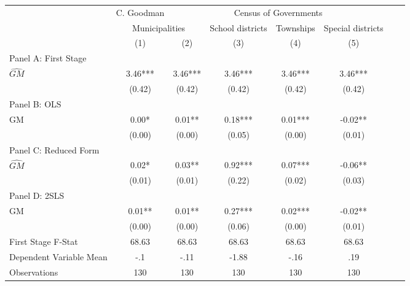    \begin{tabular}{l*{7}{c}} \toprule
&\multicolumn{1}{c}{C. Goodman}&\multicolumn{4}{c}{Census of Governments}\\\cmidrule(lr){2-2}\cmidrule(lr){3-6}
&\multicolumn{2}{c}{Municipalities}&\multicolumn{1}{c}{School districts}&\multicolumn{1}{c}{Townships}&\multicolumn{1}{c}{Special districts}\\\cmidrule(lr){2-3}\cmidrule(lr){4-6}
&\multicolumn{1}{c}{(1)}&\multicolumn{1}{c}{(2)}&\multicolumn{1}{c}{(3)}&\multicolumn{1}{c}{(4)}&\multicolumn{1}{c}{(5)}\\
\cmidrule(lr){1-6}
\multicolumn{5}{l}{Panel A: First Stage}\\
\cmidrule(lr){1-6}
$\widehat{GM}$  &     3.46***&     3.46***&     3.46***&     3.46***&     3.46***\\
                &   (0.42)   &   (0.42)   &   (0.42)   &   (0.42)   &   (0.42)   \\
\cmidrule(lr){1-6}
\multicolumn{5}{l}{Panel B: OLS}\\
\cmidrule(lr){1-6}
GM              &     0.00*  &     0.01** &     0.18***&     0.01***&    -0.02** \\
                &   (0.00)   &   (0.00)   &   (0.05)   &   (0.00)   &   (0.01)   \\
\cmidrule(lr){1-6}
\multicolumn{5}{l}{Panel C: Reduced Form}\\
\cmidrule(lr){1-6}
$\widehat{GM}$  &     0.02*  &     0.03** &     0.92***&     0.07***&    -0.06** \\
                &   (0.01)   &   (0.01)   &   (0.22)   &   (0.02)   &   (0.03)   \\
\cmidrule(lr){1-6}
\multicolumn{5}{l}{Panel D: 2SLS}\\
\cmidrule(lr){1-6}
GM              &     0.01** &     0.01** &     0.27***&     0.02***&    -0.02** \\
                &   (0.00)   &   (0.00)   &   (0.06)   &   (0.00)   &   (0.01)   \\
\midrule
First Stage F-Stat&    68.63   &    68.63   &    68.63   &    68.63   &    68.63   \\
Dependent Variable Mean&      -.1   &     -.11   &    -1.88   &     -.16   &      .19   \\
Observations    &      130   &      130   &      130   &      130   &      130   \\
       \bottomrule \end{tabular}
